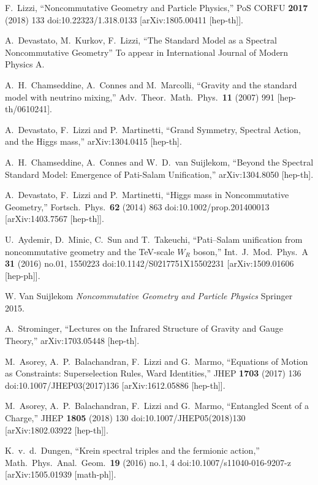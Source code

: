 \documentclass[12pt,a4paper]{article}
\begin{document}
\begin{thebibliography}{99}
 F.~Lizzi,
  ``Noncommutative Geometry and Particle Physics,''
  PoS CORFU {\bf 2017} (2018) 133
  doi:10.22323/1.318.0133
  [arXiv:1805.00411 [hep-th]].

 A.~Devastato, M.~Kurkov, F.~Lizzi,
  ``The Standard Model as a Spectral Noncommutative Geometry''
  To appear in International Journal of Modern Physics A.
  
     A.~H.~Chamseddine, A.~Connes and M.~Marcolli,
  ``Gravity and the standard model with neutrino mixing,''
  Adv.\ Theor.\ Math.\ Phys.\  {\bf 11} (2007) 991
  [hep-th/0610241].

 A.~Devastato, F.~Lizzi and P.~Martinetti,
  ``Grand Symmetry, Spectral Action, and the Higgs mass,''
  arXiv:1304.0415 [hep-th].

 A.~H.~Chamseddine, A.~Connes and W.~D.~van Suijlekom,
  ``Beyond the Spectral Standard Model: Emergence of Pati-Salam Unification,''
  arXiv:1304.8050 [hep-th].
  
 A.~Devastato, F.~Lizzi and P.~Martinetti,
  ``Higgs mass in Noncommutative Geometry,''
  Fortsch.\ Phys.\  {\bf 62} (2014) 863
  doi:10.1002/prop.201400013
  [arXiv:1403.7567 [hep-th]]. 
  
  U.~Aydemir, D.~Minic, C.~Sun and T.~Takeuchi,
  ``Pati–Salam unification from noncommutative geometry and the TeV-scale $W_R$ boson,''
  Int.\ J.\ Mod.\ Phys.\ A {\bf 31} (2016) no.01,  1550223
  doi:10.1142/S0217751X15502231
  [arXiv:1509.01606 [hep-ph]].

 W. Van Suijlekom \textit{Noncommutative Geometry and Particle Physics} Springer 2015.

  A.~Strominger,
  ``Lectures on the Infrared Structure of Gravity and Gauge Theory,''
  arXiv:1703.05448 [hep-th].

M.~Asorey, A.~P.~Balachandran, F.~Lizzi and G.~Marmo,
  ``Equations of Motion as Constraints: Superselection Rules, Ward Identities,''
  JHEP {\bf 1703} (2017) 136
  doi:10.1007/JHEP03(2017)136
  [arXiv:1612.05886 [hep-th]].

M.~Asorey, A.~P.~Balachandran, F.~Lizzi and G.~Marmo,
  ``Entangled Scent of a Charge,''
  JHEP {\bf 1805} (2018) 130
  doi:10.1007/JHEP05(2018)130
  [arXiv:1802.03922 [hep-th]].

  K.~v.~d.~Dungen,
  ``Krein spectral triples and the fermionic action,''
  Math.\ Phys.\ Anal.\ Geom.\  {\bf 19} (2016) no.1,  4
  doi:10.1007/s11040-016-9207-z
  [arXiv:1505.01939 [math-ph]].


\end{thebibliography}
\end{document}
